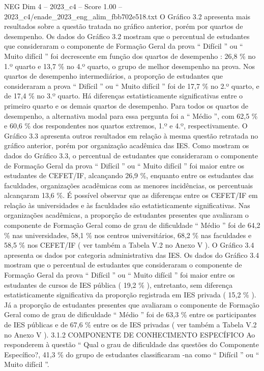 \begin{textsample}{NEG Dim 4 – 2023\_c4 – Score 1.00 – 2023\_c4/enade\_2023\_eng\_alim\_fbb702e518.txt}
O Gráfico 3.2 apresenta mais resultados sobre a questão tratada no gráfico anterior, porém por quartos de desempenho.
Os dados do Gráfico 3.2 mostram que o percentual de estudantes que consideraram o componente de Formação Geral da prova “ Difícil ” ou “ Muito difícil ” foi decrescente em função dos quartos de desempenho : 26,8 \% no 1.º quarto e 13,7 \% no 4.º quarto, o grupo de melhor desempenho na prova.
Nos quartos de desempenho intermediários, a proporção de estudantes que consideraram a prova “ Difícil ” ou “ Muito difícil ” foi de 17,7 \% no 2.º quarto, e de 17,4 \% no 3.º quarto.
Há diferenças estatisticamente significativas entre o primeiro quarto e os demais quartos de desempenho.
Para todos os quartos de desempenho, a alternativa modal para essa pergunta foi a “ Médio ”, com 62,5 \% e 60,6 \% dos respondentes nos quartos extremos, 1.º e 4.º, respectivamente.
O Gráfico 3.3 apresenta outros resultados em relação à mesma questão retratada no gráfico anterior, porém por organização acadêmica das IES.
Como mostram os dados do Gráfico 3.3, o percentual de estudantes que consideraram o componente de Formação Geral da prova “ Difícil ” ou “ Muito difícil ” foi maior entre os estudantes de CEFET/IF, alcançando 26,9 \%, enquanto entre os estudantes das faculdades, organizações acadêmicas com as menores incidências, os percentuais alcançaram 13,6 \%.
É possível observar que as diferenças entre os CEFET/IF em relação às universidades e às faculdades são estatisticamente significativas.
Nas organizações acadêmicas, a proporção de estudantes presentes que avaliaram o componente de Formação Geral como de grau de dificuldade “ Médio ” foi de 64,2 \% nas universidades, 58,1 \% nos centros universitários, 68,2 \% nas faculdades e 58,5 \% nos CEFET/IF ( ver também a Tabela V.2 no Anexo V ).
O Gráfico 3.4 apresenta os dados por categoria administrativa das IES.
Os dados do Gráfico 3.4 mostram que o percentual de estudantes que consideraram o componente de Formação Geral da prova “ Difícil ” ou “ Muito difícil ” foi maior entre os estudantes de cursos de IES pública ( 19,2 \% ), entretanto, sem diferença estatisticamente significativa da proporção registrada em IES privada ( 15,2 \% ).
Já a proporção de estudantes presentes que avaliaram o componente de Formação Geral como de grau de dificuldade “ Médio ” foi de 63,3 \% entre os participantes de IES públicas e de 67,6 \% entre os de IES privadas ( ver também a Tabela V.2 no Anexo V ). 3.1.2 COMPONENTE DE CONHECIMENTO ESPECÍFICO Ao responderem à questão “ Qual o grau de dificuldade das questões do Componente Específico?, 41,3 \% do grupo de estudantes classificaram -na como “ Difícil ” ou “ Muito difícil ”.

\end{textsample}
